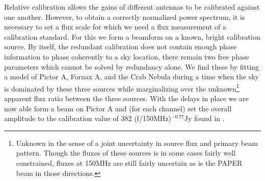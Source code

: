 \documentclass[preprint2]{aastex}
\begin{document}
Relative calibration allows the gains of different antennas to be calibrated against one another.  However, to obtain a correctly normalized power spectrum, it is necessary to set a flux scale for which we need a flux measurement of a calibration standard.  For this we form a beamform on a known, bright calibration source.  By itself, the redundant calibration does not contain enough phase information to phase coherently to a sky location, there remain two free phase parameters which cannot be solved by redundancy alone.   We find these by fitting a model of Pictor A, Fornax A, and the Crab Nebula during a time when the sky is dominated by these three sources while marginalizing over the unknown\footnote{Unknown in the sense of a joint uncertainty in source flux and primary beam pattern. Though the fluxes of these sources is in some cases fairly well constrained, fluxes at 150MHz are still fairly uncertain as is the PAPER beam in those directions.} apparent flux ratio between the three sources. With the delays in place we are now able form a beam on Pictor A and (for each channel) set the overall amplitude to the calibration value of 382 (f/150MHz)$^{-0.77}$Jy found in \cite{jacobs:2013b}.
  
\end{document}
